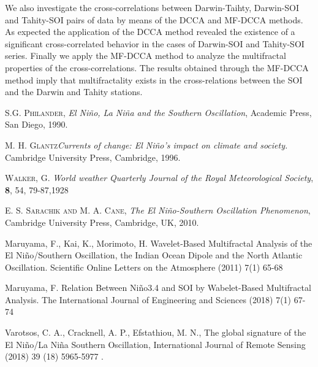 \documentclass[onecolumn, preprint,aps,amsmath, amssymb, superscriptaddress]{revtex4}
\begin{document}
We also investigate the cross-correlations between Darwin-Taihty, Darwin-SOI and Tahity-SOI pairs of data by means of the DCCA and MF-DCCA methods. As expected the application of the DCCA method revealed the existence of a significant cross-correlated behavior in the cases of Darwin-SOI and Tahity-SOI series. Finally we apply the MF-DCCA method to analyze the multifractal properties of the cross-correlations. The results obtained through the MF-DCCA method imply that multifractality exists in the cross-relations between the SOI and the Darwin and Tahity stations.

 
\begin{thebibliography}{99}

 \textsc{S.G. Philander},
\textit{El Ni\~no, La Ni\~na and the Southern Oscillation},
 Academic Press, San Diego, 1990.
 
 \textsc{M. H. Glantz}\textit{Currents of change: El Ni\~no’s impact on climate and society.} Cambridge University Press, Cambridge, 1996.

 \textsc{Walker, G.}
\textit{World weather}
\textit{Quarterly Journal of the Royal Meteorological Society}, \textbf{8}, 54, 79-87,1928

 \textsc{E. S. Sarachik and M. A. Cane},
\textit{The El Ni\~no-Southern Oscillation
Phenomenon}, Cambridge University Press, Cambridge, UK, 2010.

 Maruyama, F., Kai, K., Morimoto, H.  Wavelet-Based Multifractal Analysis of the El Ni\~no/Southern Oscillation, the Indian Ocean Dipole and the North Atlantic Oscillation. Scientific Online Letters on the Atmosphere (2011) 7(1) 65-68

 Maruyama, F. Relation Between Ni\~no3.4 and SOI by Wabelet-Based Multifractal Analysis. The International Journal of Engineering and Sciences  (2018) 7(1) 67-74

 Varotsos, C. A., Cracknell, A. P., Efstathiou, M. N., The
global signature of the El Ni\~no/La Ni\~na Southern Oscillation, International Journal of Remote Sensing (2018) 39 (18) 5965-5977 .












\end{thebibliography}
\end{document}
